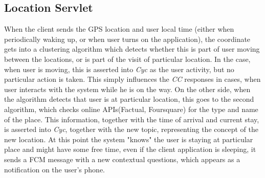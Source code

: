 \subsection{Location Servlet}
\label{section:locationServlet}
When the client sends the GPS location and user local time (either when 
periodically waking up, or when user turns on the application), the coordinate
gets into a clustering algorithm which detects whether this is part of user
moving between the locations, or is part of the visit of particular location.
In the case, when user is moving, this is asserted into \emph{Cyc} as the user
activity, but no particular action is taken. This simply influences the 
\emph{CC} responses in cases, when user interacts with the system while he is
on the way. On the other side, when the algorithm detects that user is at 
particular location, this goes to the second algorithm, which checks online 
APIs(Factual, Foursquare) for the type and name of the place. This information,
together with the time of arrival and current stay, is asserted into \emph{Cyc},
together with the new topic, representing the concept of the new location. 
At this point the system "knows" the user is staying at particular place and 
might have some free time, even if the client application is sleeping, it sends
a FCM message with a new contextual questions, which appears as a notification
on the user's phone.

